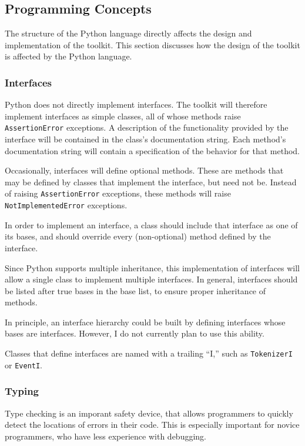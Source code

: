 \documentclass{article}
\begin{document}
\subsection{Programming Concepts}

The structure of the Python language directly affects the design and
implementation of the toolkit.  This section discusses how the design
of the toolkit is affected by the Python language.

\subsubsection{Interfaces}

Python does not directly implement interfaces.  The toolkit will
therefore implement interfaces as simple classes, all of whose methods 
raise \texttt{AssertionError} exceptions.  A description of the
functionality provided by the interface will be contained in the
class's documentation string.  Each method's documentation string will 
contain a specification of the behavior for that method.

Occasionally, interfaces will define optional methods.  These are
methods that may be defined by classes that implement the interface,
but need not be.  Instead of raising \texttt{AssertionError}
exceptions, these methods will raise \texttt{NotImplementedError}
exceptions. 

In order to implement an interface, a class should include that
interface as one of its bases, and should override every
(non-optional) method defined by the interface.

Since Python supports multiple inheritance, this implementation of
interfaces will allow a single class to implement multiple
interfaces.  In general, interfaces should be listed after true bases
in the base list, to ensure proper inheritance of methods.

In principle, an interface hierarchy could be built by defining
interfaces whose bases are interfaces.  However, I do not currently
plan to use this ability.

Classes that define interfaces are named with a trailing ``I,'' such
as \texttt{TokenizerI} or \texttt{EventI}.

\subsubsection{Typing}

Type checking is an imporant safety device, that allows programmers to
quickly detect the locations of errors in their code.  This is
especially important for novice programmers, who have less experience
with debugging.  
\end{document}
